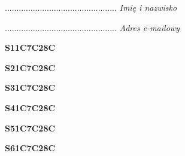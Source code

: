 \begin{turn}{90}\begin{minipage}{\linewidth} \vspace{20mm} ................................................  \textit{Imię i nazwisko}\end{minipage}\end{turn}

\begin{turn}{90}\begin{minipage}{\linewidth} \vspace{20mm} ................................................  \textit{Adres e-mailowy}\end{minipage}\end{turn}

\begin{turn}{90}\huge \begin{minipage}{\linewidth} \vspace{10mm}\textbf{S11C7C28C}\end{minipage}\end{turn}

\begin{turn}{90}\huge \begin{minipage}{\linewidth} \vspace{10mm}\textbf{S21C7C28C}\end{minipage}\end{turn}

\begin{turn}{90}\huge \begin{minipage}{\linewidth} \vspace{10mm}\textbf{S31C7C28C}\end{minipage}\end{turn}

\begin{turn}{90}\huge \begin{minipage}{\linewidth} \vspace{10mm}\textbf{S41C7C28C}\end{minipage}\end{turn}

\begin{turn}{90}\huge \begin{minipage}{\linewidth} \vspace{10mm}\textbf{S51C7C28C}\end{minipage}\end{turn}

\begin{turn}{90}\huge \begin{minipage}{\linewidth} \vspace{10mm}\textbf{S61C7C28C}\end{minipage}\end{turn}


